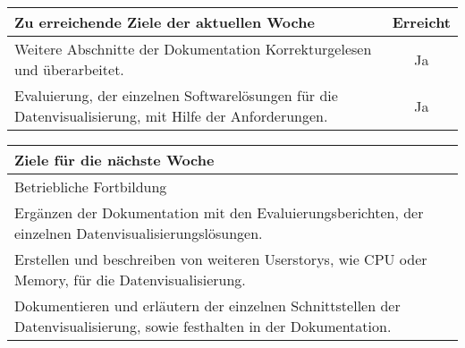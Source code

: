 \begin{tabularx}{\textwidth}{Xc}
    \arrayrulecolor{OliveGreen}
    \toprule
    {\bfseries Zu erreichende Ziele der aktuellen Woche} & {\bfseries Erreicht} \\
    \midrule[2pt]
    Weitere Abschnitte der Dokumentation Korrekturgelesen und überarbeitet. &Ja \\
    \rowcolor{OliveGreen!15}
    Evaluierung, der einzelnen Softwarelösungen für die Datenvisualisierung,
    mit Hilfe der Anforderungen.  &Ja                \\
   \bottomrule[2pt]
\end{tabularx}
%
\vspace{1cm}
%
\begin{tabularx}{\textwidth}{Xc}
    \arrayrulecolor{OliveGreen}
    \toprule
    {\bfseries Ziele für die nächste Woche}        &                         \\
    \midrule[2pt]
    Betriebliche Fortbildung                       &                         \\
    \rowcolor{OliveGreen!15}
    Ergänzen der Dokumentation mit den Evaluierungsberichten, der einzelnen
    Datenvisualisierungslösungen.       &                         \\
    \rowcolor{White}
    Erstellen und beschreiben von weiteren Userstorys, wie CPU oder Memory,
    für die Datenvisualisierung.  &                         \\
    \rowcolor{OliveGreen!15}
    Dokumentieren und erläutern der einzelnen Schnittstellen der
    Datenvisualisierung, sowie festhalten in der Dokumentation. &             \\
\end{tabularx}

